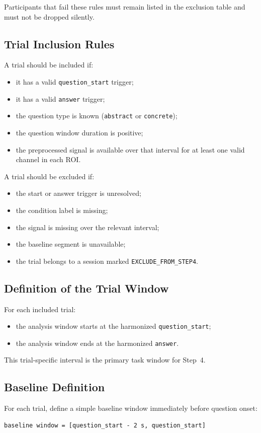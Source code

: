 Participants that fail these rules must remain listed in the exclusion table and must not be dropped silently.

\subsection{Trial Inclusion Rules}
A trial should be included if:
\begin{itemize}
    \item it has a valid \texttt{question\_start} trigger;
    \item it has a valid \texttt{answer} trigger;
    \item the question type is known (\texttt{abstract} or \texttt{concrete});
    \item the question window duration is positive;
    \item the preprocessed signal is available over that interval for at least one valid channel in each ROI.
\end{itemize}

A trial should be excluded if:
\begin{itemize}
    \item the start or answer trigger is unresolved;
    \item the condition label is missing;
    \item the signal is missing over the relevant interval;
    \item the baseline segment is unavailable;
    \item the trial belongs to a session marked \texttt{EXCLUDE\_FROM\_STEP4}.
\end{itemize}

\subsection{Definition of the Trial Window}
For each included trial:
\begin{itemize}
    \item the analysis window starts at the harmonized \texttt{question\_start};
    \item the analysis window ends at the harmonized \texttt{answer}.
\end{itemize}

This trial-specific interval is the primary task window for Step~4.

\subsection{Baseline Definition}
For each trial, define a simple baseline window immediately before question onset:
\begin{verbatim}
baseline window = [question_start - 2 s, question_start]
\end{verbatim}

